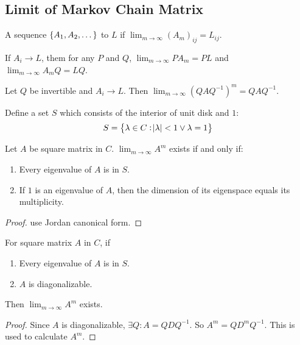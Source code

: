 \subsection{Limit of Markov Chain Matrix}

\begin{definition}
    A sequence $\set{A_1, A_2, \dots}$  to  $L$ if $\displaystyle \lim_{m \rightarrow \infty} (A_m)_{ij} = L_{ij}$.
\end{definition}

\begin{theorem}
    If $A_i \rightarrow L$, them for any $P$ and $Q$, $\displaystyle \lim_{m \rightarrow \infty} P A_m = PL$ and $\displaystyle \lim_{m \rightarrow \infty} A_m Q = LQ$.
\end{theorem}

\begin{theorem}
    Let $Q$ be invertible and $A_i \rightarrow L$. Then $\displaystyle \lim_{m \rightarrow \infty} (Q A Q^{-1})^m = Q A Q^{-1}$.
\end{theorem}

\begin{definition}
    Define a set $S$ which consists of the interior of unit disk and $1$:
    \begin{equation}
        S = \set{\lambda \in C :  \abs{\lambda} < 1   \vee \lambda = 1}
    \end{equation}
\end{definition}


\begin{theorem}
    Let $A$ be square matrix in $C$. $\displaystyle \lim_{m \rightarrow \infty} A^m$ exists if and only if:
    \begin{enumerate}
        \item Every eigenvalue of $A$ is in $S$.
        \item If $1$ is an eigenvalue of $A$, then the dimension of its eigenspace equals its multiplicity.
    \end{enumerate}
\end{theorem}
\begin{proof}
    use Jordan canonical form.
\end{proof}


\begin{theorem}
    For square matrix $A$ in $C$, if
    \begin{enumerate}
        \item Every eigenvalue of $A$ is in $S$.
        \item $A$ is diagonalizable.
    \end{enumerate}    
    Then $\displaystyle \lim_{m \rightarrow \infty} A^m$ exists.
\end{theorem}
\begin{proof}
    Since $A$ is diagonalizable, $\exists Q: A = Q D Q^{-1}$. So $A^m = Q D^m Q^{-1}$. This is used to calculate $A^m$.
\end{proof}

